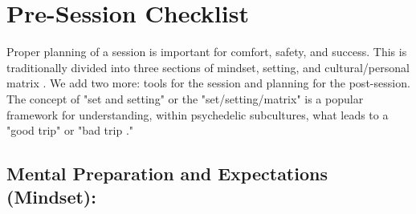 \documentclass[12pt,letterpaper]{book}
\begin{document}
\section{Pre-Session Checklist}
\label{prep}
Proper planning of a session is important for comfort, safety, and success. This is traditionally divided into three sections of mindset, setting, and cultural/personal matrix \cite{setSettingMatrix}. We add two more: tools for the session and planning for the post-session. The concept of "set and setting" or the "set/setting/matrix" is a popular framework for understanding, within psychedelic subcultures, what leads to a "good trip" or "bad trip \cite{setSettingMatrix}."

\subsection*{Mental Preparation and Expectations (Mindset):}
\end{document}
